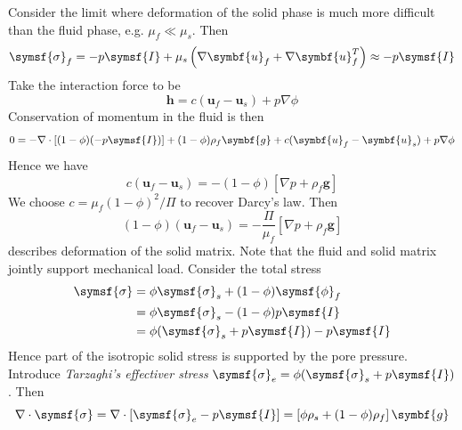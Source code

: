\documentclass{jknotes}
\renewcommand{\u}{\symbf{u}}
\begin{document}
Consider the limit where deformation of the solid phase is much more difficult
than the fluid phase, e.g. $\mu_f \ll \mu_s$. Then
\begin{equation}
	\symsf{\sigma}_f = -p\symsf{I} + \mu_s \left(\nabla \u_f + \nabla
	\u_f^T\right) \approx -p\symsf{I}
\end{equation}
Take the interaction force to be
\begin{equation}
	\symbf{h} = c(\u_f - \u_s)+p\nabla \phi
\end{equation}
Conservation of momentum in the fluid is then
\begin{equation}
	0 = -\nabla \cdot \left[ (1-\phi)(-p\symsf{I})\right] + (1-\phi) \rho_f
	\symbf{g} + c(\u_f - \u_s) + p\nabla \phi
\end{equation}
Hence we have
\begin{equation}
	c(\u_f - \u_s) = -(1-\phi)\left[\nabla p + \rho_f \symbf{g}\right]
\end{equation}
We choose $c = \mu_f(1-\phi)^2/\Pi$ to recover Darcy's law. Then
\begin{equation}
	(1-\phi) (\u_f - \u_s) = -\frac{\Pi}{\mu_f}\left[\nabla p + \rho_f
	\symbf{g}\right]
\end{equation}
describes deformation of the solid matrix. Note that the fluid and solid
matrix jointly support mechanical load. Consider the total stress
\begin{align}
	\symsf{\sigma} &= \phi \symsf{\sigma}_s + (1-\phi)\symsf{\phi}_f \\
				   &= \phi \symsf{\sigma}_s - (1-\phi)p \symsf{I} \\
				   &= \phi(\symsf{\sigma}_s + p\symsf{I}) - p \symsf{I}
\end{align}
Hence part of the isotropic solid stress is supported by the pore pressure.
Introduce \emph{Tarzaghi's effectiver stress} $\symsf{\sigma}_e =
\phi(\symsf{\sigma}_s + p\symsf{I})$.  Then
\begin{equation}
	\nabla \cdot \symsf{\sigma} = \nabla \cdot \left[\symsf{\sigma}_e
	-p\symsf{I}\right] = \left[\phi \rho_s + (1-\phi)\rho_f\right] \symbf{g}
\end{equation}
\end{document}
